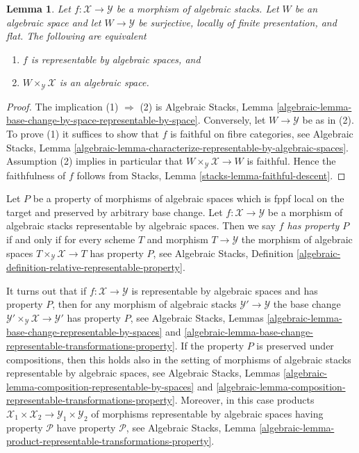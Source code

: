 \documentclass{stacks-project}
\theoremstyle{plain}
\newtheorem{lemma}[subsection]{Lemma}
\theoremstyle{definition}
\theoremstyle{remark}
\numberwithin{equation}{subsection}
\begin{document}
\begin{lemma}
\label{lemma-check-representable-covering}
Let $f : \mathcal{X} \to \mathcal{Y}$ be a morphism of algebraic stacks.
Let $W$ be an algebraic space and let $W \to \mathcal{Y}$ be surjective,
locally of finite presentation, and flat. The following are equivalent
\begin{enumerate}
\item $f$ is representable by algebraic spaces, and
\item $W \times_\mathcal{Y} \mathcal{X}$ is an algebraic space.
\end{enumerate}
\end{lemma}

\begin{proof}
The implication (1) $\Rightarrow$ (2) is
Algebraic Stacks,
Lemma \ref{algebraic-lemma-base-change-by-space-representable-by-space}.
Conversely, let $W \to \mathcal{Y}$ be as in (2). To prove (1) it
suffices to show that $f$ is faithful on fibre categories, see
Algebraic Stacks,
Lemma \ref{algebraic-lemma-characterize-representable-by-algebraic-spaces}.
Assumption (2) implies in particular that
$W \times_\mathcal{Y} \mathcal{X} \to W$ is faithful.
Hence the faithfulness of $f$ follows from
Stacks, Lemma \ref{stacks-lemma-faithful-descent}.
\end{proof}

\noindent
Let $P$ be a property of morphisms of algebraic spaces which is
fppf local on the target and preserved by arbitrary base change.
Let $f : \mathcal{X} \to \mathcal{Y}$ be a morphism of algebraic stacks
representable by algebraic spaces. Then we say
{\it $f$ has property $P$} if and only if for every scheme $T$
and morphism $T \to \mathcal{Y}$ the morphism of algebraic spaces
$T \times_\mathcal{Y} \mathcal{X} \to T$ has property $P$, see
Algebraic Stacks,
Definition \ref{algebraic-definition-relative-representable-property}.

\medskip\noindent
It turns out that if $f : \mathcal{X} \to \mathcal{Y}$ is representable
by algebraic spaces and has property $P$, then for any morphism of algebraic
stacks $\mathcal{Y}' \to \mathcal{Y}$ the base change
$\mathcal{Y}' \times_\mathcal{Y} \mathcal{X} \to \mathcal{Y}'$
has property $P$, see
Algebraic Stacks,
Lemmas \ref{algebraic-lemma-base-change-representable-by-spaces} and
\ref{algebraic-lemma-base-change-representable-transformations-property}.
If the property $P$ is preserved under compositions, then this holds
also in the setting of morphisms of algebraic stacks representable by
algebraic spaces, see
Algebraic Stacks,
Lemmas \ref{algebraic-lemma-composition-representable-by-spaces} and
\ref{algebraic-lemma-composition-representable-transformations-property}.
Moreover, in this case products
$\mathcal{X}_1 \times \mathcal{X}_2 \to \mathcal{Y}_1 \times \mathcal{Y}_2$
of morphisms representable by algebraic spaces having property $\mathcal{P}$
have property $\mathcal{P}$, see
Algebraic Stacks, Lemma
\ref{algebraic-lemma-product-representable-transformations-property}.
\end{document}
